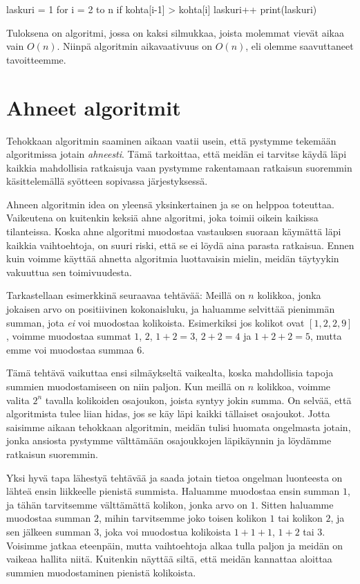 \begin{code}
laskuri = 1
for i = 2 to n
    if kohta[i-1] > kohta[i]
        laskuri++
print(laskuri)
\end{code}

Tuloksena on algoritmi, jossa on kaksi silmukkaa,
joista molemmat vievät aikaa vain $O(n)$.
Niinpä algoritmin aikavaativuus on $O(n)$,
eli olemme saavuttaneet tavoitteemme.

\section{Ahneet algoritmit}

Tehokkaan algoritmin saaminen aikaan vaatii usein,
että pystymme tekemään algoritmissa jotain \emph{ahneesti}.
Tämä tarkoittaa, että meidän ei tarvitse käydä läpi
kaikkia mahdollisia ratkaisuja vaan pystymme rakentamaan
ratkaisun suoremmin käsittelemällä syötteen sopivassa järjestyksessä.

Ahneen algoritmin idea on yleensä yksinkertainen ja
se on helppoa toteuttaa.
Vaikeutena on kuitenkin keksiä ahne algoritmi,
joka toimii oikein kaikissa tilanteissa.
Koska ahne algoritmi muodostaa vastauksen suoraan
käymättä läpi kaikkia vaihtoehtoja, on suuri riski,
että se ei löydä aina parasta ratkaisua.
Ennen kuin voimme käyttää ahnetta algoritmia luottavaisin mielin,
meidän täytyykin vakuuttua sen toimivuudesta.

Tarkastellaan esimerkkinä seuraavaa tehtävää:
Meillä on $n$ kolikkoa, jonka jokaisen arvo on positiivinen kokonaisluku,
ja haluamme selvittää pienimmän summan, jota \emph{ei} voi muodostaa kolikoista.
Esimerkiksi jos kolikot ovat $[1,2,2,9]$, voimme muodostaa summat
$1$, $2$, $1+2=3$, $2+2=4$ ja $1+2+2=5$,
mutta emme voi muodostaa summaa $6$.

Tämä tehtävä vaikuttaa ensi silmäykseltä vaikealta,
koska mahdollisia tapoja summien muodostamiseen on niin paljon.
Kun meillä on $n$ kolikkoa, voimme valita $2^n$ tavalla
kolikoiden osajoukon, joista syntyy jokin summa.
On selvää, että algoritmista tulee liian hidas,
jos se käy läpi kaikki tällaiset osajoukot.
Jotta saisimme aikaan tehokkaan algoritmin,
meidän tulisi huomata ongelmasta jotain,
jonka ansiosta pystymme välttämään osajoukkojen läpikäynnin
ja löydämme ratkaisun suoremmin.

Yksi hyvä tapa lähestyä tehtävää ja saada jotain tietoa ongelman luonteesta
on lähteä ensin liikkeelle pienistä summista.
Haluamme muodostaa ensin summan $1$, ja tähän tarvitsemme välttämättä
kolikon, jonka arvo on $1$.
Sitten haluamme muodostaa summan $2$, mihin tarvitsemme joko
toisen kolikon $1$ tai kolikon $2$, ja sen jälkeen summan $3$,
joka voi muodostua kolikoista $1+1+1$, $1+2$ tai $3$.
Voisimme jatkaa eteenpäin, mutta vaihtoehtoja alkaa tulla
paljon ja meidän on vaikeaa hallita niitä.
Kuitenkin näyttää siltä, että meidän kannattaa aloittaa
summien muodostaminen pienistä kolikoista.


